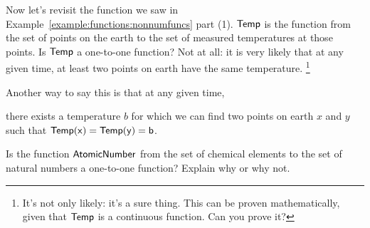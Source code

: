 \begin{example}{}
Now let's revisit the function we saw in Example~\ref{example:functions:nonnumfuncs} part (1).  $\sf{Temp}$ is the function from the set of points on the earth to the set of measured temperatures at those points.  Is $\sf{Temp}$ a one-to-one function?  Not at all: it is very likely that at any given time, at least two points on earth have the same temperature.  
\footnote{It's not only likely: it's a sure thing. This can be proven mathematically, given that $\sf{Temp}$ is a continuous function.  Can you prove it?}

Another way to say this is that at any given time, 

\begin{center}
there exists a temperature $b$ for which we can find two points on earth $x$ and $y$ such that  $\sf{Temp}(x) = \sf{Temp}(y) = b$.
\end{center}
\end{example}

\begin{exercise}{}
Is the function $\sf{Atomic Number}$ from the set of chemical elements to the set of natural numbers a one-to-one function?  Explain why or why not.
\end{exercise}

